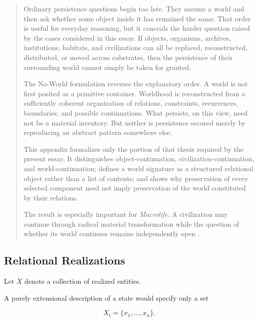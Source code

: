 \documentclass[
  11pt,
  a4paper,
  DIV=12,
  BCOR=0mm,
  parskip=half-
]{scrartcl}
\theoremstyle{definition}
\theoremstyle{plain}
\theoremstyle{remark}
\newenvironment{orientation}
  {%
    \begin{quote}
    \small
    \setlength{\parindent}{1em}
  }
  {%
    \end{quote}
  }
\begin{document}
\begin{orientation}
Ordinary persistence questions begin too late. They assume a world and then
ask whether some object inside it has remained the same. That order is useful
for everyday reasoning, but it conceals the harder question raised by the
cases considered in this essay. If objects, organisms, archives, institutions,
habitats, and civilizations can all be replaced, reconstructed, distributed,
or moved across substrates, then the persistence of their surrounding world
cannot simply be taken for granted.

The No-World formulation reverses the explanatory order. A world is not first
posited as a primitive container. Worldhood is reconstructed from a sufficiently
coherent organization of relations, constraints, recurrences, boundaries, and
possible continuations. What persists, on this view, need not be a material
inventory. But neither is persistence secured merely by reproducing an abstract
pattern somewhere else.

This appendix formalizes only the portion of that thesis required by the
present essay. It distinguishes object-continuation, civilization-continuation,
and world-continuation; defines a world signature as a structured relational
object rather than a list of contents; and shows why preservation of every
selected component need not imply preservation of the world constituted by
their relations.

The result is especially important for \emph{Macrolife}. A civilization may
continue through radical material transformation while the question of whether
its world continues remains independently open \cite{zebrowski1979}.
\end{orientation}


\subsection{Relational Realizations}
\label{app:relational-realizations}

Let \(X\) denote a collection of realized entities.

A purely extensional description of a state would specify only a set

\[
  X_t
  =
  \{
    x_1,\ldots,x_n
  \}.
\]
\end{document}
